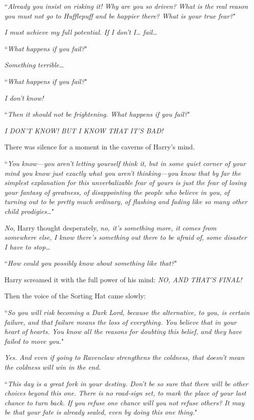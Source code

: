 ``\emph{Already you insist on risking it! Why are you so driven? What is the real reason you must not go to Hufflepuff and \emph{be happier} there? What is your true fear?}"

\emph{I must achieve my full potential. If I don't I{\ldots} fail{\ldots}}

``\emph{What happens if you fail?}"

\emph{Something terrible{\ldots}}

``\emph{What happens if you fail?}"

\emph{I don't know!}

``\emph{Then it should not be frightening. What happens if you fail?}"

\emph{I DON'T KNOW! BUT I KNOW THAT IT'S BAD!}

There was silence for a moment in the caverns of Harry's mind.

``\emph{You know—you aren't letting yourself think it, but in some quiet corner of your mind you know just exactly \emph{what} you aren't thinking—you \emph{know} that by far the simplest explanation for this unverbalizable fear of yours is just the fear of losing your fantasy of greatness, of disappointing the people who believe in you, of turning out to be pretty much ordinary, of flashing and fading like so many other child prodigies{\ldots}}"

\emph{No,} Harry thought desperately, \emph{no, it's something more, it comes from somewhere else, I know there's something out there to be afraid of, some disaster I have to stop{\ldots}}

``\emph{How could you possibly know about something like that?}"

Harry screamed it with the full power of his mind: \emph{NO, AND THAT'S FINAL!}

Then the voice of the Sorting Hat came slowly:

``\emph{So you will risk becoming a Dark Lord, because the alternative, to you, is certain failure, and that failure means the loss of everything. You believe that in your heart of hearts. You know all the reasons for doubting this belief, and they have failed to move you.}"

\emph{Yes. And even if going to Ravenclaw \emph{strengthens} the coldness, that doesn't mean the coldness will \emph{win} in the end.}

``\emph{This day is a great fork in your destiny. Don't be so sure that there will be other choices beyond this one. There is no road-sign set, to mark the place of your \emph{last} chance to turn back. If you refuse one chance will you not refuse others? It may be that your fate is already sealed, even by doing this one thing.}"

